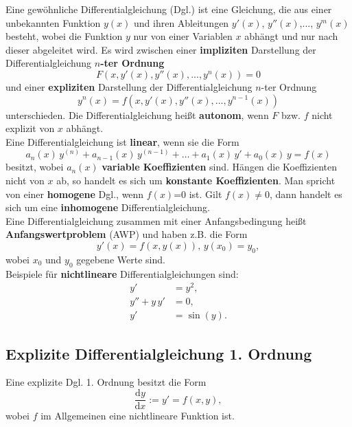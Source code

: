 Eine gew\"ohnliche Differentialgleichung (Dgl.) ist eine Gleichung, die aus einer unbekannten Funktion $y(x)$ und ihren Ableitungen $y'(x)$, $y''(x)$,..., $y^m(x)$ besteht, wobei die Funktion $y$ nur von einer Variablen $x$ abh\"angt und nur nach dieser abgeleitet wird. Es wird zwischen einer \textbf{impliziten} Darstellung der Differentialgleichung \textbf{$n$-ter Ordnung}
$$
F(x, y'(x), y''(x),..., y^n(x)) =0
$$
und einer \textbf{expliziten} Darstellung der Differentialgleichung $n$-ter Ordnung
$$
y^n(x) = f(x, y'(x), y''(x),..., y^{n-1}(x)) 
$$
unterschieden. Die Differentialgleichung hei\ss t \textbf{autonom}, wenn $F$ bzw. $f$ nicht explizit von $x$ abh\"angt. \\

\noindent
Eine Differentialgleichung ist \textbf{linear}, wenn sie die Form
$$
a_n(x)\, y^{(n)} + a_{n-1}(x)\, y^{(n-1)} + \dots + a_1(x)\, y' + a_0(x)\, y = f(x)
$$
besitzt, wobei $a_n(x)$ \textbf{variable Koeffizienten} sind. H\"angen die Koeffizienten nicht von $x$ ab, so handelt es sich um \textbf{konstante Koeffizienten}.
Man spricht von einer \textbf{homogene} Dgl., wenn $f(x)$=0 ist. Gilt $f(x) \neq 0$, dann handelt es sich um eine \textbf{inhomogene} Differentialgleichung.\\

\noindent
Eine Differentialgleichung zusammen mit einer Anfangsbedingung hei\ss t \textbf{Anfangswertproblem} (AWP) und haben z.B. die Form
$$
y'(x)=f(x,y(x)), \,  y(x_0) = y_0,
$$
wobei $x_0$ und $y_0$ gegebene Werte sind.\\

\noindent
Beispiele f\"ur \textbf{nichtlineare} Differentialgleichungen sind:
\begin{align*}
y' &= y^2, \\
y'' +y \, y' &= 0,\\
y' &= \sin(y).
\end{align*}

\subsection*{Explizite Differentialgleichung 1. Ordnung}
Eine explizite Dgl. 1. Ordnung besitzt die Form
$$
\dfrac{\mathrm{d}y}{\mathrm{d}x}:= y' = f(x,y),
$$
wobei $f$ im Allgemeinen eine nichtlineare Funktion ist. \\


